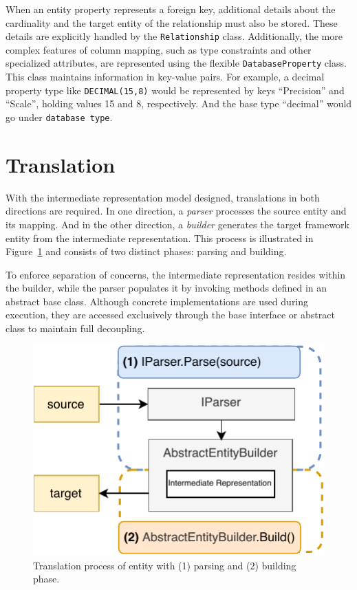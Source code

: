 When an entity property represents a foreign key, additional details about the cardinality and the target entity of the relationship must also be stored. These details are explicitly handled by the \texttt{Relationship} class. Additionally, the more complex features of column mapping, such as type constraints and other specialized attributes, are represented using the flexible \texttt{DatabaseProperty} class. This class maintains information in key-value pairs. For example, a decimal property type like \texttt{DECIMAL(15,8)} would be represented by  keys ``Precision'' and ``Scale'', holding values 15 and 8, respectively. And the base type ``decimal'' would go under \texttt{database type}. 



\section{Translation}

With the intermediate representation model designed, translations in both directions are required. In one direction, a \textit{parser} processes the source entity and its mapping. And in the other direction, a \textit{builder} generates the target framework entity from the intermediate representation. This process is illustrated in Figure~\ref{fig:translation_process} and consists of two distinct phases: parsing and building.

To enforce separation of concerns, the intermediate representation resides within the builder, while the parser populates it by invoking methods defined in an abstract base class. Although concrete implementations are used during execution, they are accessed exclusively through the base interface or abstract class to maintain full decoupling.

\begin{figure}[ht]
  \centering
  \includegraphics[scale=1]{thesis/img/thesis/03_translate_process.drawio.pdf}
  \caption{Translation process of entity with (1) parsing and (2) building phase.}
  \label{fig:translation_process}
\end{figure}

